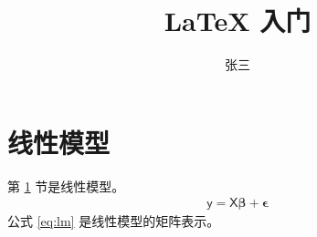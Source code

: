 \documentclass[b5paper]{article}
\title{LaTeX 入门}
\author{张三}
\begin{document}
\maketitle
\tableofcontents
\section{线性模型} \label{sec:lm}
第 \ref{sec:lm} 节是线性模型。
\begin{align} \label{eq:lm}
\bm{\mathsf{y}} = \bm{\mathsf{X}}\bm{\beta} + \bm{\epsilon}
\end{align}
公式 \ref{eq:lm} 是线性模型的矩阵表示。
\end{document}

